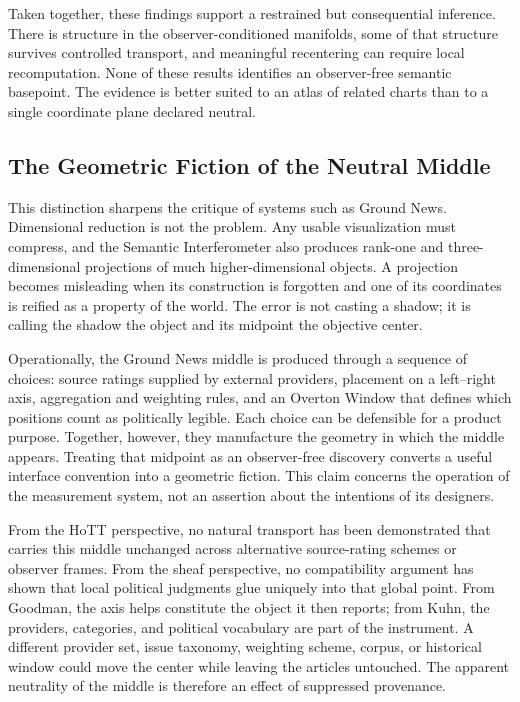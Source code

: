 Taken together, these findings support a restrained but consequential inference. There is structure in the observer-conditioned manifolds, some of that structure survives controlled transport, and meaningful recentering can require local recomputation. None of these results identifies an observer-free semantic basepoint. The evidence is better suited to an atlas of related charts than to a single coordinate plane declared neutral.

\subsection{The Geometric Fiction of the Neutral Middle}

This distinction sharpens the critique of systems such as Ground News. Dimensional reduction is not the problem. Any usable visualization must compress, and the Semantic Interferometer also produces rank-one and three-dimensional projections of much higher-dimensional objects. A projection becomes misleading when its construction is forgotten and one of its coordinates is reified as a property of the world. The error is not casting a shadow; it is calling the shadow the object and its midpoint the objective center.

Operationally, the Ground News middle is produced through a sequence of choices: source ratings supplied by external providers, placement on a left--right axis, aggregation and weighting rules, and an Overton Window that defines which positions count as politically legible. Each choice can be defensible for a product purpose. Together, however, they manufacture the geometry in which the middle appears. Treating that midpoint as an observer-free discovery converts a useful interface convention into a geometric fiction. This claim concerns the operation of the measurement system, not an assertion about the intentions of its designers.

From the HoTT perspective, no natural transport has been demonstrated that carries this middle unchanged across alternative source-rating schemes or observer frames. From the sheaf perspective, no compatibility argument has shown that local political judgments glue uniquely into that global point. From Goodman, the axis helps constitute the object it then reports; from Kuhn, the providers, categories, and political vocabulary are part of the instrument. A different provider set, issue taxonomy, weighting scheme, corpus, or historical window could move the center while leaving the articles untouched. The apparent neutrality of the middle is therefore an effect of suppressed provenance.

